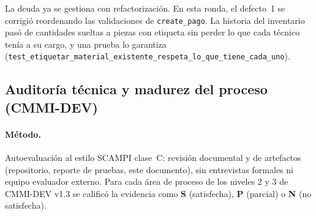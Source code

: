 \noindent La deuda ya se gestiona con refactorización. En esta ronda, el defecto~1 se corrigió
reordenando las validaciones de \texttt{create\_pago}. La historia del inventario pasó de
cantidades sueltas a piezas con etiqueta sin perder lo que cada técnico tenía a su cargo, y una
prueba lo garantiza (\texttt{test\_etiquetar\_material\_existente\_respeta\_lo\_que\_tiene\_cada\_uno}).

\subsection{Auditoría técnica y madurez del proceso (CMMI-DEV)}

\paragraph{Método.} Autoevaluación al estilo SCAMPI clase~C: revisión documental y de
artefactos (repositorio, reporte de pruebas, este documento), sin entrevistas formales ni
equipo evaluador externo. Para cada área de proceso de los niveles 2 y 3 de CMMI-DEV v1.3 se
calificó la evidencia como \textbf{S} (satisfecha), \textbf{P} (parcial) o \textbf{N} (no
satisfecha).

